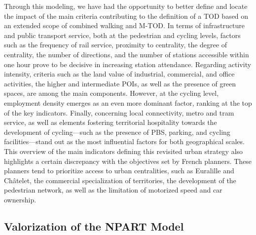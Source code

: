 \begin{refsegment}
Through this modeling, we have had the opportunity to better define and locate the impact of the main criteria contributing to the definition of a \acrshort{TOD} based on an extended scope of combined walking and \acrshort{M-TOD}. In terms of infrastructure and public transport service, both at the pedestrian and cycling levels, factors such as the frequency of rail service, proximity to centrality, the degree of centrality, the number of directions, and the number of stations accessible within one hour prove to be decisive in increasing station attendance. Regarding activity intensity, criteria such as the land value of industrial, commercial, and office activities, the higher and intermediate \acrshort{POIs}, as well as the presence of green spaces, are among the main components. However, at the cycling level, employment density emerges as an even more dominant factor, ranking at the top of the key indicators. Finally, concerning local connectivity, metro and tram service, as well as elements fostering territorial hospitality towards the development of cycling—such as the presence of \acrshort{PBS}, parking, and cycling facilities—stand out as the most influential factors for both geographical scales. This overview of the main indicators defining this revisited urban strategy also highlights a certain discrepancy with the objectives set by French planners. These planners tend to prioritize access to urban centralities, such as Euralille and Châtelet, the commercial specialization of territories, the development of the pedestrian network, as well as the limitation of motorized speed and car ownership.%

\subsection*{Valorization of the \acrshort{NPART} Model
    \label{chap6:conclusion-valorisation}
    }


\end{refsegment}
